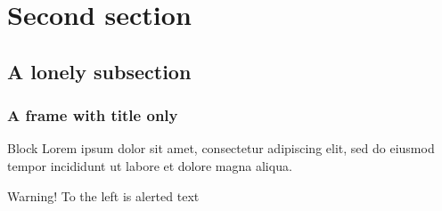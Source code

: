 \documentclass{beamer}
\begin{document}
\section{Second section}
\subsection{A lonely subsection}

\begin{frame}
\frametitle{A frame with title only}
\begin{block}{Block}
Lorem ipsum dolor sit amet, consectetur adipiscing elit, sed do eiusmod tempor incididunt ut labore et dolore magna aliqua.
\end{block}
\begin{alert}{Warning!}
To the left is alerted text
\end{alert}
\end{frame}
\end{document}
